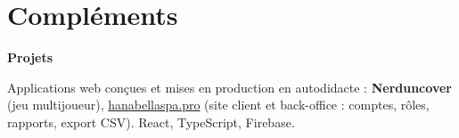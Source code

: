 \documentclass[10pt,a4paper]{article}
\newlength{\datecol}\setlength{\datecol}{0.155\textwidth}
\newlength{\gutter}\setlength{\gutter}{0.85em}
\newlength{\bodycol}
\newcommand{\skillrow}[2]{%
  \par\noindent
  \begin{minipage}[t]{\datecol}
    \vspace{0pt}\raggedright{\headingfont\bfseries\footnotesize #1}
  \end{minipage}%
  \hspace{\gutter}%
  \begin{minipage}[t]{\bodycol}
    \vspace{0pt}\raggedright\footnotesize #2
  \end{minipage}%
  \par\vspace{0.38ex}
}
\begin{document}
\section{Compléments}
\skillrow{Projets}{Applications web conçues et mises en production en autodidacte : \textbf{Nerduncover}
(jeu multijoueur), \href{https://hanabellaspa.pro}{hanabellaspa.pro} (site client et back-office : comptes,
rôles, rapports, export CSV). React, TypeScript, Firebase.}
\end{document}
